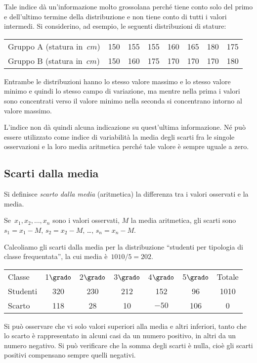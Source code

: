 \begin{esempio}
Tale indice dà un'informazione molto grossolana perché tiene conto solo del 
primo e dell'ultimo termine della
distribuzione e non tiene conto di tutti i valori intermedi. Si 
considerino, ad esempio, le seguenti distribuzioni di stature:
\begin{center}
 \begin{tabular}{lccccccc}
 \toprule
 Gruppo A (statura in~\(\unit{cm}\)) & 150 & 155 & 155 & 160 & 165 & 180 & 
175 \\
 Gruppo B (statura in~\(\unit{cm}\)) & 150 & 160 & 175 & 170 & 170 & 170 & 
180 \\
 \bottomrule
\end{tabular}
\end{center}

Entrambe le distribuzioni hanno lo stesso valore massimo e lo stesso valore 
minimo e quindi lo stesso campo di
variazione, ma mentre nella prima i valori sono concentrati verso il valore 
minimo nella seconda si concentrano intorno al valore massimo.

L'indice non dà quindi alcuna indicazione su quest'ultima informazione. Né 
può essere utilizzato come indice di
variabilità la media degli scarti fra le singole osservazioni e la loro 
media aritmetica perché tale valore è sempre uguale a zero.

\subsection{Scarti dalla media}
\label{subsec:stat02_scarti}

\begin{definizione}
Si definisce \emph{scarto dalla media} (aritmetica) la differenza tra i 
valori osservati e la media.
\end{definizione}

Se~\(x_1, x_2, \ldots, x_n\) sono i valori osservati, \(M\) la media 
aritmetica, gli scarti sono~\(s_1=x_1-M\), \(s_2=x_2-M\), \ldots, 
\(s_n=x_n-M\).
\end{esempio}

\begin{esempio}
Calcoliamo gli scarti dalla media per la distribuzione ``studenti per 
tipologia di classe frequentata'', la cui media è~\(1010/5 = 202\).
\begin{center}
\begin{tabular}{l*{6}{c}}
\toprule
Classe & 1\(\grado\) & 2\(\grado\) & 3\(\grado\) & 4\(\grado\) & 5\(\grado\) 
& 
Totale\\
Studenti & 320& 230& 212& 152& 96& 1010 \\
Scarto & 118 & 28 & 10 & \(-50\) & 106 & 0\\
\bottomrule
\end{tabular}
\end{center}
Si può osservare che vi solo valori superiori alla media e altri inferiori, 
tanto che lo scarto è rappresentato in
alcuni casi da un numero positivo, in altri da un numero negativo. Si può 
verificare che la somma degli scarti è nulla,
cioè gli scarti positivi compensano sempre quelli negativi.
 \end{esempio}

